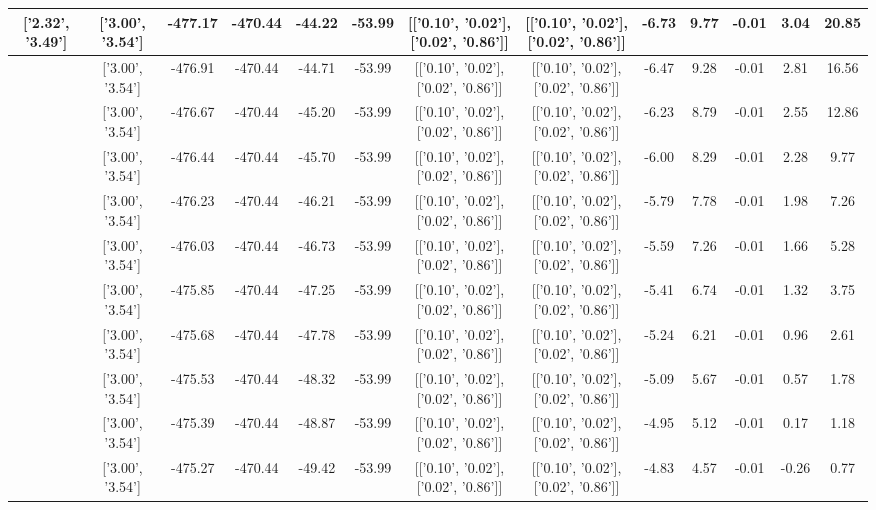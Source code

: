 \begin{table}[htbp]
\begin{adjustbox}{angle=90}
\begin{tabular}{|c|c|c|c|c|c|c|c|c|c|c|c|c|}
 ['2.32', '3.49'] & ['3.00', '3.54'] & -477.17 & -470.44 & -44.22 & -53.99 & [['0.10', '0.02'], ['0.02', '0.86']] & [['0.10', '0.02'], ['0.02', '0.86']] & -6.73 & 9.77 & -0.01 & 3.04 & 20.85\\ \hline
 ['2.36', '3.50'] & ['3.00', '3.54'] & -476.91 & -470.44 & -44.71 & -53.99 & [['0.10', '0.02'], ['0.02', '0.86']] & [['0.10', '0.02'], ['0.02', '0.86']] & -6.47 & 9.28 & -0.01 & 2.81 & 16.56\\ \hline
 ['2.40', '3.50'] & ['3.00', '3.54'] & -476.67 & -470.44 & -45.20 & -53.99 & [['0.10', '0.02'], ['0.02', '0.86']] & [['0.10', '0.02'], ['0.02', '0.86']] & -6.23 & 8.79 & -0.01 & 2.55 & 12.86\\ \hline
 ['2.43', '3.50'] & ['3.00', '3.54'] & -476.44 & -470.44 & -45.70 & -53.99 & [['0.10', '0.02'], ['0.02', '0.86']] & [['0.10', '0.02'], ['0.02', '0.86']] & -6.00 & 8.29 & -0.01 & 2.28 & 9.77\\ \hline
 ['2.47', '3.50'] & ['3.00', '3.54'] & -476.23 & -470.44 & -46.21 & -53.99 & [['0.10', '0.02'], ['0.02', '0.86']] & [['0.10', '0.02'], ['0.02', '0.86']] & -5.79 & 7.78 & -0.01 & 1.98 & 7.26\\ \hline
 ['2.51', '3.51'] & ['3.00', '3.54'] & -476.03 & -470.44 & -46.73 & -53.99 & [['0.10', '0.02'], ['0.02', '0.86']] & [['0.10', '0.02'], ['0.02', '0.86']] & -5.59 & 7.26 & -0.01 & 1.66 & 5.28\\ \hline
 ['2.55', '3.51'] & ['3.00', '3.54'] & -475.85 & -470.44 & -47.25 & -53.99 & [['0.10', '0.02'], ['0.02', '0.86']] & [['0.10', '0.02'], ['0.02', '0.86']] & -5.41 & 6.74 & -0.01 & 1.32 & 3.75\\ \hline
 ['2.59', '3.51'] & ['3.00', '3.54'] & -475.68 & -470.44 & -47.78 & -53.99 & [['0.10', '0.02'], ['0.02', '0.86']] & [['0.10', '0.02'], ['0.02', '0.86']] & -5.24 & 6.21 & -0.01 & 0.96 & 2.61\\ \hline
 ['2.62', '3.52'] & ['3.00', '3.54'] & -475.53 & -470.44 & -48.32 & -53.99 & [['0.10', '0.02'], ['0.02', '0.86']] & [['0.10', '0.02'], ['0.02', '0.86']] & -5.09 & 5.67 & -0.01 & 0.57 & 1.78\\ \hline
 ['2.66', '3.52'] & ['3.00', '3.54'] & -475.39 & -470.44 & -48.87 & -53.99 & [['0.10', '0.02'], ['0.02', '0.86']] & [['0.10', '0.02'], ['0.02', '0.86']] & -4.95 & 5.12 & -0.01 & 0.17 & 1.18\\ \hline
 ['2.70', '3.52'] & ['3.00', '3.54'] & -475.27 & -470.44 & -49.42 & -53.99 & [['0.10', '0.02'], ['0.02', '0.86']] & [['0.10', '0.02'], ['0.02', '0.86']] & -4.83 & 4.57 & -0.01 & -0.26 & 0.77\\ \hline

\end{tabular}
\end{adjustbox}
\end{table}
